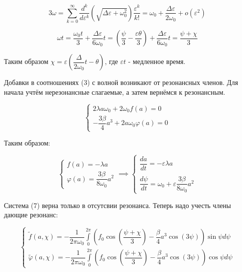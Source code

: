 \documentclass[a4paper, 12pt]{article}
\begin{document}
	\begin{equation}
		3\omega = \displaystyle\sum\limits_{k=0}^{\infty} \dfrac{d^k}{d\varepsilon^k} \left(\sqrt{\Delta \varepsilon + \omega_0^2}\right) \dfrac{\varepsilon^k}{k!} = \omega_0 + \dfrac{\Delta \varepsilon }{2\omega_0} + o(\varepsilon^2)
	\end{equation}
	
	\begin{equation}
		\omega t = \dfrac{\omega_0 t}{3} + \dfrac{\Delta \varepsilon}{6\omega_0}t = \left(\dfrac{\psi}{3} - \dfrac{\varepsilon \theta}{3}\right) + \dfrac{\Delta \varepsilon}{6\omega_0} t = \dfrac{\psi + \chi}{3} 
	\end{equation}
	
	\begin{center}
		Таким образом $\chi = \varepsilon\left(\dfrac{\Delta }{2\omega_0} t - \theta\right)$, где $\varepsilon t$ - медленное время. 
	\end{center}
	
	\quad Добавки в соотношениях (3) с волной возникают от резонансных членов. Для начала учтём нерезонансные слагаемые, а затем вернёмся к резонансным. 
	
	\begin{equation}
		\begin{cases}
			2\lambda a\omega_0 + 2\omega_0 f(a) = 0 \\
			-\dfrac{3\beta}{4}a^3 + 2a\omega_0 \varphi(a) = 0
		\end{cases}
	\end{equation}
	
	\quad Таким образом:
	
	\begin{equation}
		\begin{cases}
			f(a) = -\lambda a \\
			\varphi(a) = \dfrac{3\beta}{8\omega_0}a^2
		\end{cases} \implies \begin{cases}
			\dfrac{da}{dt} = -\varepsilon \lambda a \\
			\\
			\dfrac{d\psi}{dt} =  \omega_0 + \varepsilon \dfrac{3\beta}{8\omega_0}a^2
		\end{cases}
	\end{equation}
	
	\quad Система (7) верна только в отсутсвии резонанса. Теперь надо учесть члены дающие резонанс: 
	
	\begin{equation}
		\begin{cases}
			\tilde{f}(a, \chi) = -\dfrac{1}{2\pi\omega_0} \displaystyle\int\limits_{0}^{2\pi} \left(f_0 \cos\left(\dfrac{\psi + \chi}{3}\right) - \dfrac{\beta}{4}a^3\cos(3\psi)\right)\sin\psi d\psi  \\
			\tilde{\varphi}(a, \chi) = -\dfrac{1}{2\pi\omega_0} \displaystyle\int\limits_{0}^{2\pi} \left(f_0 \cos\left(\dfrac{\psi + \chi}{3}\right) - \dfrac{\beta}{4}a^3\cos(3\psi)\right)\cos\psi d\psi
		\end{cases}
	\end{equation}
	
\end{document}
